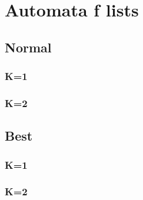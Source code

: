 
\twocolumn
\chapter{Automata f lists}
\label{chap:automataFlists}

% 
\section{Normal}
\subsection{K=1}
\scriptsize
\noindent

\subsection{K=2}
\noindent


\section{Best}
\subsection{K=1}
\scriptsize
\noindent

\subsection{K=2}
\noindent
\normalsize
\onecolumn
